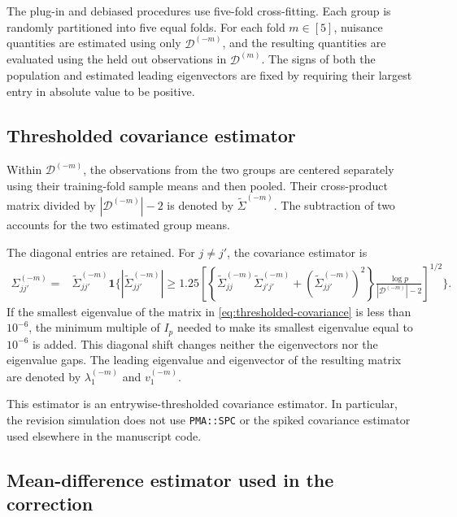 \documentclass[11pt]{article}
\begin{document}
The plug-in and debiased procedures use five-fold cross-fitting. Each group is
randomly partitioned into five equal folds. For each fold $m\in[5]$, nuisance
quantities are estimated using only
$\mathcal D^{(-m)}$, and the resulting quantities are evaluated using the held
out observations in $\mathcal D^{(m)}$. The signs of both the population and
estimated leading eigenvectors are fixed by requiring their largest entry in
absolute value to be positive.

\subsection{Thresholded covariance estimator}

Within $\mathcal D^{(-m)}$, the observations from the two groups are centered
separately using their training-fold sample means and then pooled. Their
cross-product matrix divided by $|\mathcal D^{(-m)}|-2$ is denoted by
$\widetilde\Sigma^{(-m)}$. The subtraction of two accounts for the two
estimated group means.

The diagonal entries are retained. For $j\neq j'$, the covariance estimator is
\begin{align}
\Sigma_{jj'}^{(-m)}
={}&\widetilde\Sigma_{jj'}^{(-m)}
\mathbf 1\Bigg\{
\left|\widetilde\Sigma_{jj'}^{(-m)}\right|
\geq 1.25
\left[
\left\{
\widetilde\Sigma_{jj}^{(-m)}
\widetilde\Sigma_{j'j'}^{(-m)}
+\left(\widetilde\Sigma_{jj'}^{(-m)}\right)^2
\right\}
\frac{\log p}{|\mathcal D^{(-m)}|-2}
\right]^{1/2}
\Bigg\}.
\label{eq:thresholded-covariance}
\end{align}
If the smallest eigenvalue of the matrix in
\eqref{eq:thresholded-covariance} is less than $10^{-6}$, the minimum multiple
of $I_p$ needed to make its smallest eigenvalue equal to $10^{-6}$ is added.
This diagonal shift changes neither the eigenvectors nor the eigenvalue gaps.
The leading eigenvalue and eigenvector of the resulting matrix are denoted by
$\lambda_1^{(-m)}$ and $v_1^{(-m)}$.

This estimator is an entrywise-thresholded covariance estimator. In
particular, the revision simulation does not use \texttt{PMA::SPC} or the
spiked covariance estimator used elsewhere in the manuscript code.

\subsection{Mean-difference estimator used in the correction}
\end{document}
